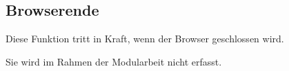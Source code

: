 \subsection{Browserende}
\label{subsec:funktionale-end}

Diese Funktion tritt in Kraft, wenn der Browser geschlossen wird.

Sie wird im Rahmen der Modularbeit nicht erfasst.
